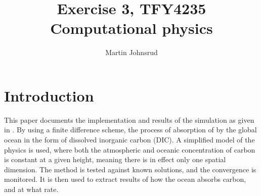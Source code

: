 \documentclass{article}
\title{Exercise 3, TFY4235 Computational physics}
\author{Martin Johnsrud}
\date{}
\begin{document}
    \maketitle
    \section*{Introduction}
        This paper documents the implementation and results of the simulation as given in \cite{exercise}.
        By using a finite difference scheme, the process of absorption of  by the global ocean in the form of dissolved inorganic carbon (DIC).
        A simplified model of the physics is used, where both the atmospheric and oceanic concentration of carbon is constant at a given height, meaning there is in effect only one spatial dimension.
        The method is tested against known solutions, and the convergence is monitored.
        It is then used to extract results of how the ocean absorbs carbon, and at what rate.
\end{document}
